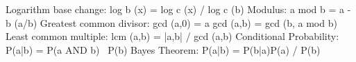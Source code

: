 \documentclass{article}
\begin{document}
Logarithm base change:
log b (x) = log c (x) / log c (b)
Modulus:
a mod b = a - b (a/b)
Greatest common divisor:
gcd (a,0) = a
gcd (a,b) = gcd (b, a mod b)
Least common multiple:
lcm (a,b) = |a,b| / gcd (a,b)
Conditional Probability:
P(a|b) = P(a AND b) \ P(b)
Bayes Theorem:
P(a|b) = P(b|a)P(a) / P(b)
\end{document}
